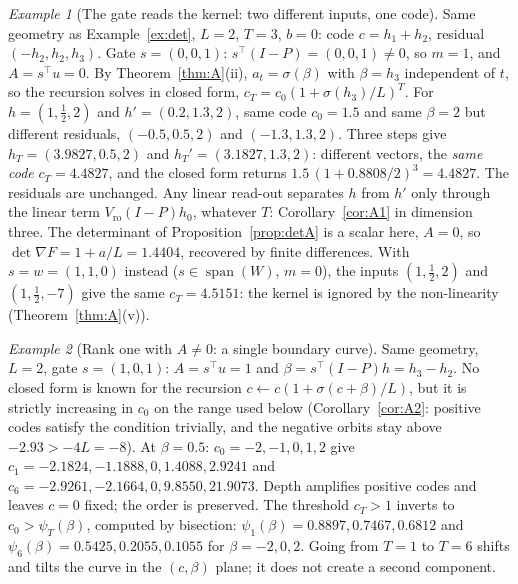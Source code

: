 \documentclass[11pt,a4paper]{article}
\theoremstyle{plain}
\theoremstyle{definition}
\theoremstyle{remark}
\newtheorem{example}{Example}
\newcommand{\spn}{\operatorname{span}}
\newcommand{\T}{\top}
\begin{document}
\begin{example}[The gate reads the kernel: two different inputs, one code]
\label{ex:A1}
Same geometry as Example~\ref{ex:det}, $L=2$, $T=3$, $b=0$: code
$c=h_1+h_2$, residual $(-h_2,h_2,h_3)$. Gate $s=(0,0,1)$: $s^\T(I-P)=(0,0,1)\ne0$,
so $m=1$, and $A=s^\T u=0$. By Theorem~\ref{thm:A}(ii), $a_t=\sigma(\beta)$
with $\beta=h_3$ independent of $t$, so the recursion solves in closed form,
$c_T=c_0(1+\sigma(h_3)/L)^T$. For $h=(1,\tfrac12,2)$ and $h'=(0.2,1.3,2)$,
same code $c_0=1.5$ and same $\beta=2$ but different residuals,
$(-0.5,0.5,2)$ and $(-1.3,1.3,2)$. Three steps give
$h_T=(3.9827,0.5,2)$ and $h_T'=(3.1827,1.3,2)$: different vectors, the
\emph{same code} $c_T=4.4827$, and the closed form returns
$1.5\,(1+0.8808/2)^3=4.4827$. The residuals are unchanged. Any linear
read-out separates $h$ from $h'$ only through the linear term
$V_{\mathrm{ro}}(I-P)h_0$, whatever $T$: Corollary~\ref{cor:A1} in dimension three. The
determinant of Proposition~\ref{prop:detA} is a scalar here, $A=0$, so
$\det\nabla F=1+a/L=1.4404$, recovered by finite differences. With
$s=w=(1,1,0)$ instead ($s\in\spn(W)$, $m=0$), the inputs $(1,\tfrac12,2)$ and
$(1,\tfrac12,-7)$ give the same $c_T=4.5151$: the kernel is ignored by the
non-linearity (Theorem~\ref{thm:A}(v)).
\end{example}

\begin{example}[Rank one with $A\ne0$: a single boundary curve]
\label{ex:A2}
Same geometry, $L=2$, gate $s=(1,0,1)$: $A=s^\T u=1$ and
$\beta=s^\T(I-P)h=h_3-h_2$. No closed form is known for the recursion
$c\leftarrow c(1+\sigma(c+\beta)/L)$, but it is strictly increasing in $c_0$
on the range used below (Corollary~\ref{cor:A2}: positive codes satisfy the
condition trivially, and the negative orbits stay above $-2.93>-4L=-8$).
At $\beta=0.5$: $c_0=-2,-1,0,1,2$ give $c_1=-2.1824,-1.1888,0,1.4088,2.9241$
and $c_6=-2.9261,-2.1664,0,9.8550,21.9073$. Depth amplifies positive codes
and leaves $c=0$ fixed; the order is preserved. The threshold $c_T>1$ inverts
to $c_0>\psi_T(\beta)$, computed by bisection: $\psi_1(\beta)=0.8897,0.7467,0.6812$
and $\psi_6(\beta)=0.5425,0.2055,0.1055$ for $\beta=-2,0,2$. Going from
$T=1$ to $T=6$ shifts and tilts the curve in the $(c,\beta)$ plane; it does
not create a second component.
\end{example}
\end{document}
